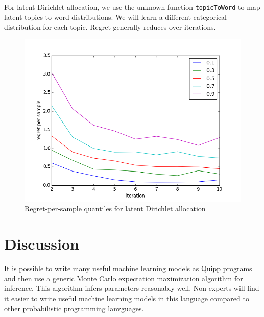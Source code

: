 \documentclass{article}
\begin{document}
For latent Dirichlet allocation, we use the unknown function \texttt{topicToWord} to map latent topics to word distributions.  We will learn a different categorical distribution for each topic.  Regret generally reduces over iterations.

  \begin{figure}[h]
\begin{center}
  \includegraphics[scale=0.5]{../plots/accuracy_lda.png}
\end{center}
\caption{Regret-per-sample quantiles for latent Dirichlet allocation}
\end{figure}

% 
% 
% 

  \section{Discussion}

  It is possible to write many useful machine learning models as Quipp programs and then use a generic Monte Carlo expectation maximization algorithm for inference.  This algorithm infers parameters reasonably well.  Non-experts will find it easier to write useful machine learning models in this language compared to other probabilistic programming lanvguages.
  
\end{document}
